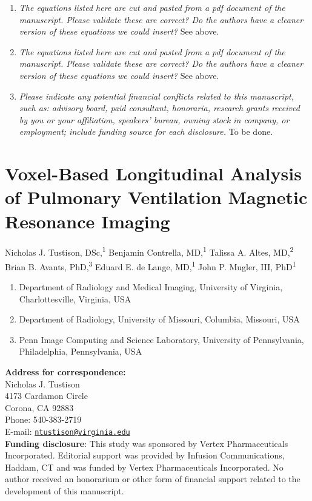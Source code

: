 \documentclass[11pt,]{article}
\providecommand{\tightlist}{%
  \setlength{\itemsep}{0pt}\setlength{\parskip}{0pt}}
\begin{document}
\begin{enumerate}
\item
  \emph{The equations listed here are cut and pasted from a pdf document
  of the manuscript. Please validate these are correct? Do the authors
  have a cleaner version of these equations we could insert?} See above.
\item
  \emph{The equations listed here are cut and pasted from a pdf document
  of the manuscript. Please validate these are correct? Do the authors
  have a cleaner version of these equations we could insert?} See above.
\item
  \emph{Please indicate any potential financial conflicts related to
  this manuscript, such as: advisory board, paid consultant, honoraria,
  research grants received by you or your affiliation, speakers' bureau,
  owning stock in company, or employment; include funding source for
  each disclosure.} To be done.
\end{enumerate}

\clearpage

\section{Voxel-Based Longitudinal Analysis of Pulmonary Ventilation
Magnetic Resonance
Imaging}\label{voxel-based-longitudinal-analysis-of-pulmonary-ventilation-magnetic-resonance-imaging}

Nicholas J. Tustison, DSc,\textsuperscript{1} Benjamin Contrella,
MD,\textsuperscript{1} Talissa A. Altes, MD,\textsuperscript{2} Brian B.
Avants, PhD,\textsuperscript{3} Eduard E. de Lange,
MD,\textsuperscript{1} John P. Mugler, III, PhD\textsuperscript{1}

\begin{enumerate}
\def\labelenumi{\arabic{enumi}.}
\tightlist
\item
  Department of Radiology and Medical Imaging, University of Virginia,
  Charlottesville, Virginia, USA
\item
  Department of Radiology, University of Missouri, Columbia, Missouri,
  USA
\item
  Penn Image Computing and Science Laboratory, University of
  Pennsylvania, Philadelphia, Pennsylvania, USA\\[8\baselineskip]
\end{enumerate}

\textbf{Address for correspondence:}\\
Nicholas J. Tustison\\
4173 Cardamon Circle\\
Corona, CA 92883\\
Phone: 540-383-2719\\
E-mail:
\href{mailto:ntustison@virginia.edu}{\nolinkurl{ntustison@virginia.edu}}\\[3\baselineskip]\textbf{Funding
disclosure}: This study was sponsored by Vertex Pharmaceuticals
Incorporated. Editorial support was provided by Infusion Communications,
Haddam, CT and was funded by Vertex Pharmaceuticals Incorporated. No
author received an honorarium or other form of financial support related
to the development of this manuscript.
\end{document}
